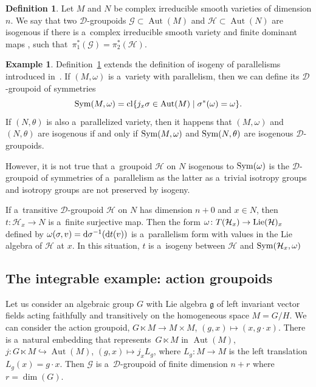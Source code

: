 \documentclass[10pt,a4paper]{amsart}
\numberwithin{equation}{section}
\theoremstyle{definition}
\newtheorem{Definition}[Theorem]{Definition}
\newtheorem{Example}[Theorem]{Example}
\begin{document}
\begin{Definition}\label{def_isogeny}
Let $M$ and $N$ be complex irreducible smooth varieties of dimension $n$. We say that two $\mathcal D$-groupoids $\mathcal G \subset \operatorname{Aut}(M)$ and $\mathcal H \subset\operatorname{Aut}(N)$ are isogenous if there is a~complex irreducible smooth variety  and finite dominant maps ,  such that~${\pi_1^\ast(\mathcal G) = \pi_2^*(\mathcal H)}$.
\end{Definition}

\begin{Example}
Definition~\ref{def_isogeny} extends the definition of isogeny of parallelisms introduced in~\cite[Definition 2.7]{bc2017}. If $(M,\omega)$ is a~variety with parallelism, then we can define its $\mathcal D$-groupoid of symmetries
\[{\rm Sym}(M,\omega) = {\rm cl}\{j_x\sigma \in \operatorname{Aut}(M)\mid \sigma^*(\omega) = \omega \}.\]
If $(N,\theta)$ is also a~parallelized variety, then it happens that $(M,\omega)$ and $(N,\theta)$ are isogenous if and only if ${\rm Sym}(M,\omega)$ and ${\rm Sym}(N,\theta)$ are isogenous $\mathcal D$-groupoids.

However, it is not true that a~groupoid $\mathcal H$ on $N$ isogenous to ${\rm Sym}(\omega)$ is the $\mathcal D$-groupoid of symmetries of a~parallelism as the latter as a~trivial isotropy groups and isotropy groups are not preserved by isogeny.

If a~transitive $\mathcal D$-groupoid $\mathcal H$ on $N$ has dimension $n+0$ and $x \in N$, then $t \colon \mathcal H_x \to N$ is a~finite surjective map. Then the form $\omega \colon T(\mathcal H_x) \to {\rm Lie}(\mathcal H)_x$ defined by $\omega(\sigma, v) = {\rm d}\sigma^{-1}({\rm d}t(v))$ is a~parallelism form with values in the Lie algebra of $\mathcal H$ at $x$.
In this situation, $t$ is a~isogeny between $\mathcal H$ and ${\rm Sym}(\mathcal H_x,\omega)$
\end{Example}


\subsection{The integrable example: action groupoids}\label{ss_actiongroupoids}

Let us consider an algebraic group $G$ with Lie algebra $\mathfrak g$ of left invariant vector fields acting faithfully and transitively on the homogeneous space $M = G/H$. We can consider the action groupoid,
$G\ltimes M \to M\times M$, $ (g, x) \mapsto (x, g\cdot x)$.
There is a~natural embedding that represents~${G\ltimes M}$ in $\operatorname{Aut}(M)$,
$j\colon G\ltimes M \hookrightarrow \operatorname{Aut}(M)$, $ (g, x) \mapsto j_x L_g$,
where $L_g\colon M\to M$ is the left translation $L_g(x) = g\cdot x$. Then $\mathcal G$ is a~$\mathcal D$-groupoid of finite dimension $n + r$ where $r = {\dim}(G)$.
\end{document}
